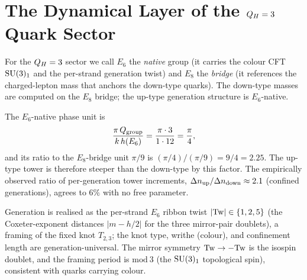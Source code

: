 %


\section*{The Dynamical Layer of the $Q_H=3$ Quark Sector}
\label{sec:quark_dynamics}

\begin{definition}
\label{P20:def:native_bridge}
For the $Q_H=3$ sector we call $E_6$ the \emph{native} group (it
carries the colour CFT $\mathrm{SU}(3)_1$ and the per-strand generation twist)
and $E_8$ the \emph{bridge} (it references the charged-lepton mass that
anchors the down-type quarks). The down-type masses are computed on the
$E_8$ bridge; the up-type generation structure is $E_6$-native.
\end{definition}

\begin{proposition}
\label{P20:prop:steepness}
The $E_6$-native phase unit is
\begin{equation}
  \frac{\pi\,Q_{\mathrm{group}}}{k\,h(E_6)}=\frac{\pi\cdot3}{1\cdot12}=\frac{\pi}{4},
  \label{P20:eq:e6phase}
\end{equation}
and its ratio to the $E_8$-bridge unit $\pi/9$ is
$(\pi/4)/(\pi/9)=9/4=2.25$. The up-type tower is therefore steeper than
the down-type by this factor. The empirically observed ratio of
per-generation tower increments, $\Delta n_{\rm up}/\Delta n_{\rm down}
\approx2.1$ (confined generations), agrees to $6\%$ with no free
parameter.
\end{proposition}

\begin{remark}
\label{P20:rem:twist}
Generation is realised as the per-strand $E_6$ ribbon twist $|\mathrm{Tw}|\in
\{1,2,5\}$ (the Coxeter-exponent distances $|m-h/2|$ for the three
mirror-pair doublets), a framing of the fixed knot $T_{2,3}$; the knot
type, writhe (colour), and confinement length are generation-universal.
The mirror symmetry $\mathrm{Tw}\to-\mathrm{Tw}$ is the isospin doublet, and the
framing period is $\mathrm{mod}\ 3$ (the $\mathrm{SU}(3)_1$ topological spin),
consistent with quarks carrying colour.
\end{remark}

